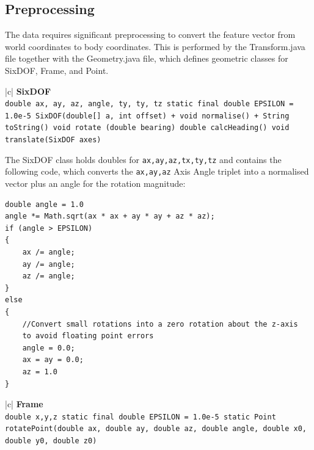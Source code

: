 \documentclass[12pt,a4,notitlepage]{report}
\renewcommand{\_}{\texttt{\symbol{95}}}
\newcommand{\<}{\texttt{\symbol{60}}}
\renewcommand{\>}{\texttt{\symbol{62}}}
\newcommand{\class}[1]{\textbf{#1}}
\newcommand{\variable}[1]{\texttt{#1}}
\begin{document}
{\subsection{Preprocessing}

The data requires significant preprocessing to convert the feature vector from world coordinates to body coordinates. This is performed by the Transform.java file together with the Geometry.java file, which defines geometric classes for SixDOF, Frame, and Point.

\begin{tabular}{|c|} \hline 
\class{SixDOF} \\ \hline
{}
{\variable{double ax, ay, az, angle, ty, ty, tz \newline
  static final double EPSILON = 1.0e-5 \newline
  SixDOF(double[] a, int offset) \newline
  + void normalise() \newline
  + String toString() \newline
  void rotate (double bearing) \newline
  double calcHeading() \newline
  void translate(SixDOF axes)
} } \\ \hline
\end{tabular}

The SixDOF class holds doubles for \variable{ax,ay,az,tx,ty,tz} and contains the following code, which converts the \variable{ax,ay,az} Axis Angle triplet into a normalised vector plus an angle for the rotation magnitude:

\begin{verbatim}
double angle = 1.0
angle *= Math.sqrt(ax * ax + ay * ay + az * az);
if (angle > EPSILON)
{
    ax /= angle;
    ay /= angle;
    az /= angle;
}
else
{
    //Convert small rotations into a zero rotation about the z-axis 
    to avoid floating point errors
    angle = 0.0;
    ax = ay = 0.0;
    az = 1.0
}
\end{verbatim}

\begin{tabular}{|c|} \hline 
\class{Frame} \\ \hline
{}
{\variable{double x,y,z \newline
  static final double EPSILON = 1.0e-5 \newline
  static Point rotatePoint(double ax, double ay, double az, double angle, double x0, double y0, double z0)
} } \\ \hline
\end{tabular}

}
\end{document}
